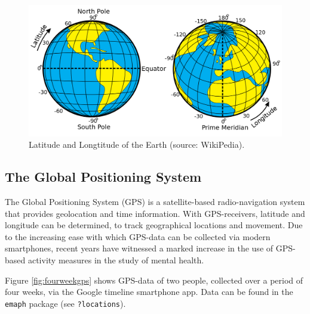 \documentclass[]{book}
\begin{document}
\begin{figure}[!h]

{\centering \includegraphics[width=0.75\linewidth]{images/activity/Latitude_and_Longitude_of_the_Earth} 

}

\caption{Latitude and Longtitude of the Earth (source: WikiPedia).}\label{fig:longlat}
\end{figure}

\subsection{The Global Positioning
System}\label{the-global-positioning-system}


The Global Positioning System (GPS) is a satellite-based
radio-navigation system that provides geolocation and time information.
With GPS-receivers, latitude and longitude can be determined, to track
geographical locations and movement. Due to the increasing ease with
which GPS-data can be collected via modern smartphones, recent years
have witnessed a marked increase in the use of GPS-based activity
measures in the study of mental health.

Figure \ref{fig:fourweekgps} shows GPS-data of two people, collected
over a period of four weeks, via the Google timeline smartphone app.
Data can be found in the \texttt{emaph} package (see
\texttt{?locations}).
\end{document}
